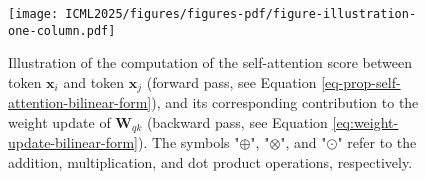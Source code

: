 %
\begin{figure}[ht]
\begin{center}
\texttt{[image: ICML2025/figures/figures-pdf/figure-illustration-one-column.pdf]}
\end{center}
%
\caption{
%
%
Illustration of the computation of the self-attention score between token $\bm{x}_i$ and token $\bm{x}_j$ (forward pass, see Equation \eqref{eq-prop-self-attention-bilinear-form}), and its corresponding contribution to the weight update of $\bm{W}_{qk}$ (backward pass, see Equation \eqref{eq:weight-update-bilinear-form}).
%
The symbols "$\oplus$", "$\otimes$", and "$\odot$" refer to the addition, multiplication, and dot product operations, respectively.
%
}
%
\label{fig-illustration}
%
\end{figure}